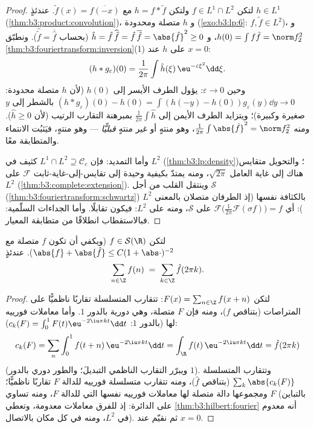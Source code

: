 \begin{proof}
لتكن $f \in L^1\cap L^2$ ولتكن $h = f * \tilde f$ مع $\tilde f(x) = \overline{f(-x)}$. عندئذٍ $h \in L^1$
(\cref{thm:b3:product:convolution})، و $h$ متصلة ومحدودة (\cref{exo:b3:lp:6}: $f, \tilde f \in L^2$)،
و $h(0) =
\int f\bar f = \norm f_2^2$، و $\hat h = \hat
f\,\widehat{\tilde f} = \hat f\,\overline{\hat f} =
\abs{\hat f}^2 \geq 0$ (بحساب $\widehat{\tilde f} =
\overline{\hat f}$). ونطبّق \cref{thm:b3:fouriertransform:inversion}(1) على
$h$ عند $x = 0$:
\[
(h * g_\varepsilon)(0) = \frac1{2\pi}\int \hat
h(\xi)\,\eu^{-\varepsilon\xi^2}\dd\xi .
\]
وحين $\varepsilon \to 0$: يؤول الطرف الأيسر إلى $h(0)$ (لأن $h$ متصلة
محدودة: $(h*g_\varepsilon)(0) - h(0) = \int(h(-y)
- h(0))g_\varepsilon(y)\dd y \to 0$ بالشطر إلى $y$ صغيرة وكبيرة)؛ ويتزايد الطرف
الأيمن إلى $\frac1{2\pi}\int\hat h$ بمبرهنة التقارب الرتيب (لأن $\hat h \geq 0$).
ومنه $\frac1{2\pi}\int\abs{\hat f}^2 =
\norm f_2^2$، وهو منتهٍ أو غير منتهٍ \emph{قبليًّا} --- وهو
منتهٍ، فيَثبُت الانتماء والمتطابقة معًا.

وأما التمديد: فإن $L^1\cap L^2 \supseteq \mathcal C_c$ كثيف في $L^2$ (\cref{thm:b3:lp:density})؛ والتحويل
متقايس هناك إلى غاية العامل $\sqrt{2\pi}$، ومنه يمتدّ بكيفية
وحيدة إلى تقايس-إلى-غاية-ثابت $\mathcal F$ على $L^2$
(\cref{thm:b3:complete:extension}). وينتقل القلب من أجل $\mathcal S$ (\cref{thm:b3:fouriertransform:schwartz})
بالكثافة نفسها (إذ الطرفان متصلان بالمعنى $L^2$): أي $\mathcal
F\bigl(\frac1{2\pi}\mathcal F(\sigma f)\bigr) = f$
على $\mathcal S$، ومنه على $L^2$: فيكون تقابلًا. وأما الجداءات
السلّمية: فبالاستقطاب انطلاقًا من متطابقة المعيار.
\end{proof}

\begin{theorem}
\label{thm:b3:fouriertransform:poisson}
لتكن $f \in \mathcal S(\R)$ (ويكفي أن تكون $f$ متصلة مع $\abs{f} +
\abs{\hat f} \leq C(1 + \abs\cdot)^{-2}$). عندئذٍ
\[
\sum_{n\in\Z} f(n) \;=\; \sum_{k\in\Z}\hat f(2\pi k) .
\]
\end{theorem}

\begin{proof}
لتكن $F(x) = \sum_{n\in\Z}f(x + n)$: تتقارب المتسلسلة تقاربًا ناظميًّا على المتراصات
(بتناقص $f$)، ومنه فإن $F$ متصلة، وهي دورية بالدور $1$. وأما
معاملات فورييه لها (بالدور $1$: $c_k(F) = \int_0^1F(t)\eu^{-2\iu\pi kt}\dd t$):
\[
c_k(F) = \sum_n\int_0^1 f(t + n)\,\eu^{-2\iu\pi kt}\dd t
= \int_\R f(t)\,\eu^{-2\iu\pi kt}\dd t = \hat f(2\pi k)
\]
(ويبرّر التقارب الناظمي التبديلَ؛ والطور دوري بالدور $1$).
وتتقارب المتسلسلة $\sum_k\abs{c_k(F)}$ (بتناقص $\hat f$)، ومنه تتقارب
متسلسلة فورييه للدالة $F$ تقاربًا ناظميًّا؛ ومجموعها دالة متصلة
لها معاملات فورييه نفسها التي للدالة $F$، ومنه تساوي $F$
(بالتباين على الدائرة: إذ للفرق معاملات معدومة، وتعطي
\cref{thm:b3:hilbert:fourier} أنه معدوم في $L^2$، ومنه في كل مكان بالاتصال). ثم
نقيّم عند $x = 0$.
\end{proof}

